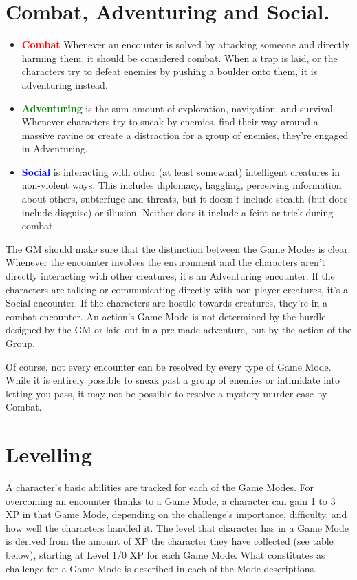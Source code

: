\section{Combat, Adventuring and Social.}\label{sec:gameModes}
\begin{itemize}
	\item \textcolor{red}{\textbf{Combat}} Whenever an encounter is solved by attacking someone and directly harming them, it should be considered combat.
	When a trap is laid, or the characters try to defeat enemies by pushing a boulder onto them, it is adventuring instead.

	\item \textcolor{green}{\textbf{Adventuring}} is the sum amount of exploration, navigation, and survival.
	Whenever characters try to sneak by enemies, find their way around a massive ravine or create a distraction for a group of enemies, they're engaged in Adventuring.

	\item \textcolor{blue}{\textbf{Social}} is interacting with other (at least somewhat) intelligent creatures in non-violent ways.
	This includes diplomacy, haggling, perceiving information about others, subterfuge and threats, but ít doesn't include stealth (but does include disguise) or illusion. 
	Neither does it include a feint or trick during combat.
	
\end{itemize}

The GM should make sure that the distinction between the Game Modes is clear. 
Whenever the encounter involves the environment and the characters aren't directly interacting with other creatures, it's an Adventuring encounter. If the characters are talking or communicating directly with non-player creatures, it's a Social encounter. If the characters are hostile towards creatures, they're in a combat encounter. An action's Game Mode is not determined by the hurdle designed by the GM or laid out in a pre-made adventure, but by the action of the Group.

Of course, not every encounter can be resolved by every type of Game Mode. 
While it is entirely possible to sneak past a group of enemies or intimidate into letting you pass, it may not be possible to resolve a mystery-murder-case by Combat.

\section{Levelling}\label{sec:levelling}
A character’s basic abilities are tracked for each of the Game Modes.
For overcoming an encounter thanks to a Game Mode, a character can gain 1 to 3 XP in that Game Mode, depending on the challenge’s importance, difficulty, and how well the characters handled it.
The level that character has in a Game Mode is derived from the amount of XP the character they have collected (see table below), starting at Level 1/0 XP for each Game Mode.
What constitutes as challenge for a Game Mode is described in each of the Mode descriptions.

